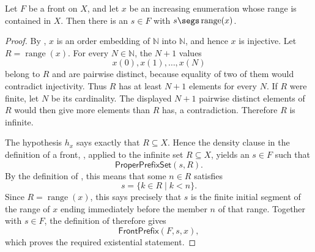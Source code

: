 \begin{lemma}
Let $F$ be a front on $X$, and let $x$ be an increasing enumeration whose
range is contained in $X$.  Then there is an $s\in F$ with
$s\segs\operatorname{range}(x)$.
\end{lemma}
\begin{proof}
By , $x$ is an order embedding of $\mathbb N$ into
$\mathbb N$, and hence $x$ is injective.  Let
$R=\operatorname{range}(x)$.  For every $N\in\mathbb N$, the $N+1$
values
\[
x(0),x(1),\ldots,x(N)
\]
belong to $R$ and are pairwise distinct, because equality of two of them
would contradict injectivity.  Thus $R$ has at least $N+1$ elements for
every $N$.  If $R$ were finite, let $N$ be its cardinality.  The displayed
$N+1$ pairwise distinct elements of $R$ would then give more elements than
$R$ has, a contradiction.  Therefore $R$ is infinite.

The hypothesis $h_x$ says exactly that $R\subseteq X$.  Hence the density
clause in the definition of a front, , applied to the
infinite set $R\subseteq X$, yields an $s\in F$ such that
\[
\mathsf{ProperPrefixSet}(s,R).
\]
By the definition of , this means that some
$n\in R$ satisfies
\[
s=\{k\in R\mid k<n\}.
\]
Since $R=\operatorname{range}(x)$, this says precisely that $s$ is the
finite initial segment of the range of $x$ ending immediately before the
member $n$ of that range.  Together with $s\in F$, the definition of
 therefore gives
\[
\mathsf{FrontPrefix}(F,s,x),
\]
which proves the required existential statement.
\end{proof}

